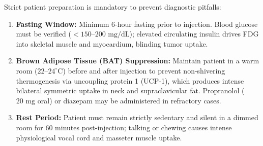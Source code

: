 \documentclass[11pt,a4paper]{article}
\begin{document}
\begin{protocolbox}
Strict patient preparation is mandatory to prevent diagnostic pitfalls:
\begin{enumerate}
    \item \textbf{Fasting Window:} Minimum 6-hour fasting prior to injection. Blood glucose must be verified ($< 150\text{--}200\text{ mg/dL}$); elevated circulating insulin drives FDG into skeletal muscle and myocardium, blinding tumor uptake.
    \item \textbf{Brown Adipose Tissue (BAT) Suppression:} Maintain patient in a warm room ($22\text{--}24^\circ\text{C}$) before and after injection to prevent non-shivering thermogenesis via uncoupling protein 1 (UCP-1), which produces intense bilateral symmetric uptake in neck and supraclavicular fat. Propranolol ($20\text{ mg}$ oral) or diazepam may be administered in refractory cases.
    \item \textbf{Rest Period:} Patient must remain strictly sedentary and silent in a dimmed room for 60 minutes post-injection; talking or chewing causes intense physiological vocal cord and masseter muscle uptake.
\end{enumerate}
\end{protocolbox}
\end{document}
